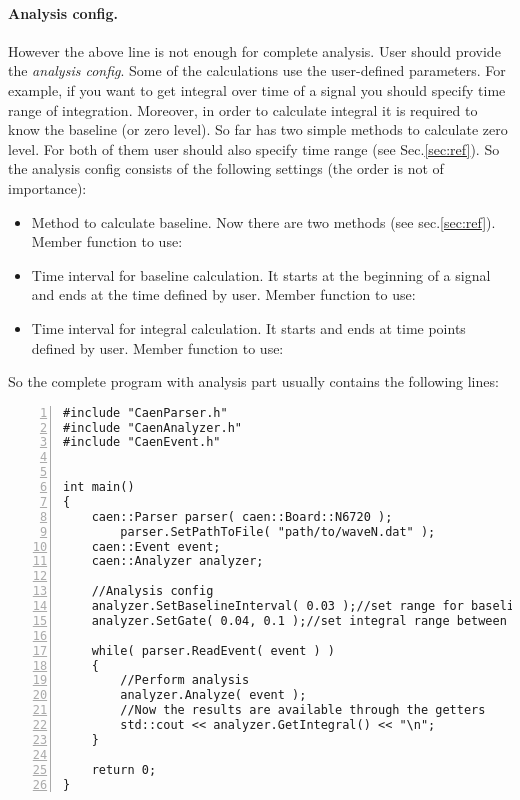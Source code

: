 \paragraph*{Analysis config.}
However the above line is not enough for complete analysis. User should provide the
\emph{analysis config}. Some of the calculations use the user-defined parameters. For example, if
you want to get integral over time of a signal you should specify time range of
integration. Moreover, in order to calculate integral it is required to know the baseline
(or zero level). So far  has two simple methods to calculate zero level.
For both of them user should also specify time range (see Sec.\ref{sec:ref}). So the
analysis config consists of the following settings (the order is not of importance):
\begin{itemize}
    \item{Method to calculate baseline. Now there are two methods (see sec.\ref{sec:ref}).
Member function to use: }
    \item{Time interval for baseline calculation. It starts at the beginning of a signal
and ends at the time defined by user. Member function to use: }
    \item{Time interval for integral calculation. It starts and ends at time points defined
by user. Member function to use: }
\end{itemize}


\noindent So the complete program with analysis part usually contains the following lines:
\begin{lstlisting}[numbers=left, caption={Print integral of each event in \codet{waveN.dat} calculated within the range from 40 to 100 nanosecs}]
#include "CaenParser.h"
#include "CaenAnalyzer.h"
#include "CaenEvent.h"


int main()
{
    caen::Parser parser( caen::Board::N6720 );
        parser.SetPathToFile( "path/to/waveN.dat" );
    caen::Event event;
    caen::Analyzer analyzer;

    //Analysis config
    analyzer.SetBaselineInterval( 0.03 );//set range for baseline calcultation: the first 30 ns of the signal
    analyzer.SetGate( 0.04, 0.1 );//set integral range between 40 and 100 ns

    while( parser.ReadEvent( event ) )
    {
        //Perform analysis
        analyzer.Analyze( event );
        //Now the results are available through the getters 
        std::cout << analyzer.GetIntegral() << "\n";
    }

    return 0;
}

\end{lstlisting}

